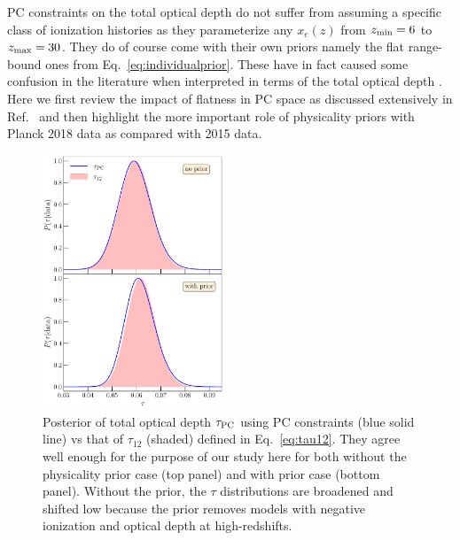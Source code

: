 \documentclass[prd,twocolumn,amsmath,amssymb,floatfix,superscriptaddress,nofootinbib]{revtex4-1}
\begin{document}
PC constraints on the total optical depth do not suffer from assuming a specific class of ionization histories as they parameterize any $x_e(z)$ from $z_{\rm min}=6$ to $z_{\rm max}=30$.
They do of course come with their own priors namely the flat
range-bound ones from Eq.~\eqref{eq:individualprior}.
These have in fact caused some confusion in the literature when interpreted in terms of the total optical depth \cite{Millea:2018bko}.  Here we first review the impact of flatness in PC space as discussed extensively in Ref.~\cite{Heinrich:2018btc} and then highlight the more important role of physicality priors with Planck 2018 data as compared with
2015 data.


\begin{figure}[ht]
\includegraphics[width=0.48\textwidth]{paper/plots/plot_tau12_new_apply_cut_False_vs_True_pl18_pc_zmax30_pliklite_srollv2_1015_two_panels.pdf}
\caption{Posterior of total optical depth $\tau_{\rm PC}$ using PC constraints (blue solid line) vs that of $\tau_{12}$ (shaded) defined in Eq.~\ref{eq:tau12}. They agree well enough for the purpose of our study here for both without the physicality prior case (top panel) and with prior case (bottom panel). Without the prior, the $\tau$ distributions are broadened and shifted low because the prior removes models with negative ionization and optical depth at high-redshifts.}
\label{fig:tau12}
\end{figure}
\end{document}
